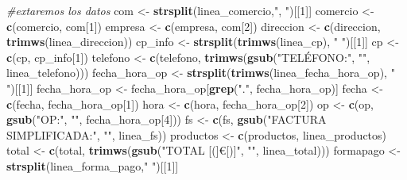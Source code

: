 \documentclass[,,,oneauthor,pdftex]{Definitions/mdpi}
\newenvironment{Shaded}{\begin{snugshade}}{\end{snugshade}}
\newcommand{\CommentTok}[1]{\textcolor[rgb]{0.56,0.35,0.01}{\textit{#1}}}
\newcommand{\DecValTok}[1]{\textcolor[rgb]{0.00,0.00,0.81}{#1}}
\newcommand{\FunctionTok}[1]{\textcolor[rgb]{0.13,0.29,0.53}{\textbf{#1}}}
\newcommand{\NormalTok}[1]{#1}
\newcommand{\OtherTok}[1]{\textcolor[rgb]{0.56,0.35,0.01}{#1}}
\newcommand{\StringTok}[1]{\textcolor[rgb]{0.31,0.60,0.02}{#1}}
\begin{document}
\begin{Shaded}
\begin{Highlighting}[]
  \CommentTok{\#extaremos los datos}
\NormalTok{  com }\OtherTok{\textless{}{-}} \FunctionTok{strsplit}\NormalTok{(linea\_comercio,}\StringTok{", "}\NormalTok{)[[}\DecValTok{1}\NormalTok{]]}
\NormalTok{  comercio }\OtherTok{\textless{}{-}} \FunctionTok{c}\NormalTok{(comercio, com[}\DecValTok{1}\NormalTok{])}
\NormalTok{  empresa }\OtherTok{\textless{}{-}} \FunctionTok{c}\NormalTok{(empresa, com[}\DecValTok{2}\NormalTok{])}
\NormalTok{  direccion }\OtherTok{\textless{}{-}} \FunctionTok{c}\NormalTok{(direccion, }\FunctionTok{trimws}\NormalTok{(linea\_direccion))}
\NormalTok{  cp\_info }\OtherTok{\textless{}{-}} \FunctionTok{strsplit}\NormalTok{(}\FunctionTok{trimws}\NormalTok{(linea\_cp), }\StringTok{" "}\NormalTok{)[[}\DecValTok{1}\NormalTok{]]}
\NormalTok{  cp }\OtherTok{\textless{}{-}} \FunctionTok{c}\NormalTok{(cp, cp\_info[}\DecValTok{1}\NormalTok{])}
\NormalTok{  telefono }\OtherTok{\textless{}{-}} \FunctionTok{c}\NormalTok{(telefono, }\FunctionTok{trimws}\NormalTok{(}\FunctionTok{gsub}\NormalTok{(}\StringTok{"TELÉFONO:"}\NormalTok{, }\StringTok{""}\NormalTok{, linea\_telefono)))}
\NormalTok{  fecha\_hora\_op }\OtherTok{\textless{}{-}} \FunctionTok{strsplit}\NormalTok{(}\FunctionTok{trimws}\NormalTok{(linea\_fecha\_hora\_op), }\StringTok{" "}\NormalTok{)[[}\DecValTok{1}\NormalTok{]]}
\NormalTok{  fecha\_hora\_op }\OtherTok{\textless{}{-}}\NormalTok{ fecha\_hora\_op[}\FunctionTok{grep}\NormalTok{(}\StringTok{"."}\NormalTok{, fecha\_hora\_op)]}
\NormalTok{  fecha }\OtherTok{\textless{}{-}} \FunctionTok{c}\NormalTok{(fecha, fecha\_hora\_op[}\DecValTok{1}\NormalTok{])}
\NormalTok{  hora }\OtherTok{\textless{}{-}} \FunctionTok{c}\NormalTok{(hora, fecha\_hora\_op[}\DecValTok{2}\NormalTok{])}
\NormalTok{  op }\OtherTok{\textless{}{-}} \FunctionTok{c}\NormalTok{(op, }\FunctionTok{gsub}\NormalTok{(}\StringTok{"OP:"}\NormalTok{, }\StringTok{""}\NormalTok{, fecha\_hora\_op[}\DecValTok{4}\NormalTok{]))}
\NormalTok{  fs }\OtherTok{\textless{}{-}} \FunctionTok{c}\NormalTok{(fs, }\FunctionTok{gsub}\NormalTok{(}\StringTok{"FACTURA SIMPLIFICADA:"}\NormalTok{, }\StringTok{""}\NormalTok{, linea\_fs))}
\NormalTok{  productos }\OtherTok{\textless{}{-}} \FunctionTok{c}\NormalTok{(productos, linea\_productos)}
\NormalTok{  total }\OtherTok{\textless{}{-}} \FunctionTok{c}\NormalTok{(total, }\FunctionTok{trimws}\NormalTok{(}\FunctionTok{gsub}\NormalTok{(}\StringTok{"TOTAL [(]€[)]"}\NormalTok{, }\StringTok{""}\NormalTok{, linea\_total)))}
\NormalTok{  formapago }\OtherTok{\textless{}{-}} \FunctionTok{strsplit}\NormalTok{(linea\_forma\_pago,}\StringTok{" "}\NormalTok{)[[}\DecValTok{1}\NormalTok{]]}

\end{Highlighting}
\end{Shaded}
\end{document}
